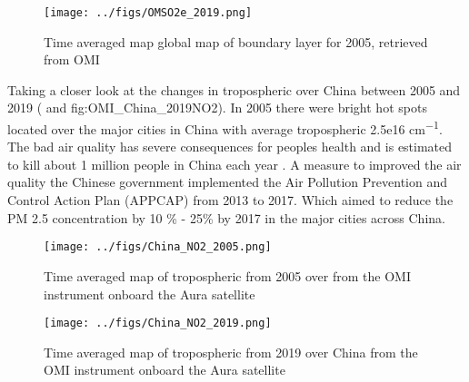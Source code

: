 \begin{figure}[htbp]
    \centering
        \texttt{[image: ../figs/OMSO2e\_2019.png]}
    \caption{Time averaged map global map of boundary layer  for 2005, retrieved from OMI}
    \label{fig:OMI_global_2019SO2}
\end{figure}


Taking a closer look at the changes in tropospheric  over China
between 2005 and 2019 ( and \Cref
{fig:OMI_China_2019NO2}). In 2005 there were bright hot spots located
over the major cities in China with average tropospheric
 2.5e16 \si{cm^{-1}}. The bad air quality has severe consequences 
for peoples health and is estimated to kill about 1 million people in 
China each year \parencite{yue2020stronger}. A measure to improved the 
air quality the Chinese government implemented the Air Pollution 
Prevention and Control Action Plan (APPCAP) from 2013 to 2017. Which 
aimed to reduce the PM 2.5 concentration by 10 \% - 25\% by 2017 in the major cities across China.      
\begin{figure}[htpb]
    \centering
    \texttt{[image: ../figs/China\_NO2\_2005.png]}
    \caption{Time averaged map of tropospheric  from 2005 over 
    from the OMI instrument onboard the Aura satellite}
    \label{fig:OMI_ChinaNO2}
\end{figure}

\begin{figure}[htpb]
    \centering
        \texttt{[image: ../figs/China\_NO2\_2019.png]}
    \caption{Time averaged map of tropospheric  from 2019 
    over China from the OMI instrument  
    onboard the Aura satellite}
    \label{fig:OMI_China_2019NO2}
\end{figure}

